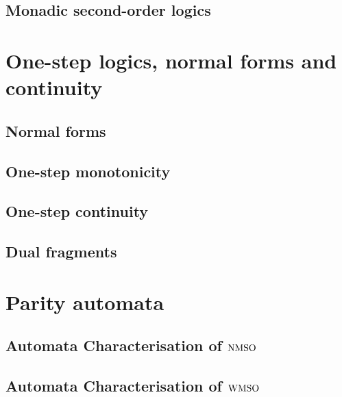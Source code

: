 \documentclass[prodmode,acmtecs]{acmsmall} %
\begin{document}
\subsection{Monadic second-order logics}\label{sec:prel-so}


\clearpage





\section{One-step logics, normal forms and continuity}\label{sec:onestep}

\subsection{Normal forms}\label{subsec:normalforms}

\subsection{One-step monotonicity}\label{subsec:one-stepmonot}

\subsection{One-step continuity}\label{subsec:one-stepcont}

\subsection{Dual fragments}\label{subsec:one-stepduals}


\clearpage


\section{Parity automata}\label{sec:parityaut}



\subsection{Automata Characterisation of $\mathrm{NMSO}$}




\subsection{Automata Characterisation of $\mathrm{WMSO}$}
\end{document}

